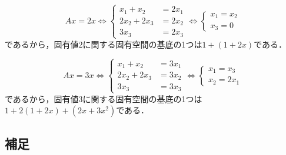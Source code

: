\documentclass{jsarticle}
\theoremstyle{definition}
\begin{document}
\begin{enumerate}
\[ Ax=2x\Leftrightarrow
\begin{cases}x_1+x_2&=2x_1 \\ 2x_2+2x_3&=2x_2 \\ 3x_3&=2x_3\end{cases}
\Leftrightarrow\begin{cases}x_1=x_2 \\ x_3=0\end{cases} \]
であるから，固有値2に関する固有空間の基底の1つは$1+(1+2x)$である．

\[ Ax=3x\Leftrightarrow
\begin{cases}x_1+x_2&=3x_1 \\ 2x_2+2x_3&=3x_2 \\ 3x_3&=3x_3\end{cases}
\Leftrightarrow\begin{cases}x_1=x_3 \\ x_2=2x_1\end{cases} \]
であるから，固有値3に関する固有空間の基底の1つは$1+2(1+2x)+(2x+3x^2)$である．
\end{enumerate}

\subsection{補足}
\end{document}
